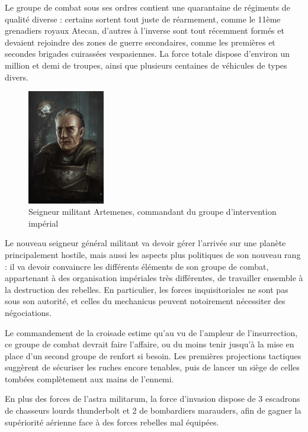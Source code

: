 \documentclass[10pt,a4paper]{book}
\begin{document}
Le groupe de combat sous ses ordres contient une quarantaine de régiments de qualité diverse : certains sortent tout juste de réarmement, comme le 11ème grenadiers royaux Atecan, d'autres à l'inverse sont tout récemment formés et devaient rejoindre des zones de guerre secondaires, comme les premières et secondes brigades cuirassées vespasiennes. La force totale dispose d'environ un million et demi de troupes, ainsi que plusieurs centaines de véhicules de types divers.

\begin{figure}
  \centering
  \includegraphics[width = 0.3\textwidth]{officer 1.jpg}
  \caption{Seigneur militant Artemenes, commandant du groupe d'intervention impérial}
\end{figure}

Le nouveau seigneur général militant va devoir gérer l'arrivée sur une planète principalement hostile, mais aussi les aspects plus politiques de son nouveau rang : il va devoir convaincre les différents éléments de son groupe de combat, appartenant à des organisation impériales très différentes, de travailler ensemble à la destruction des rebelles. En particulier, les forces inquisitoriales ne sont pas sous son autorité, et celles du mechanicus peuvent notoirement nécessiter des négociations.

Le commandement de la croisade estime qu'au vu de l'ampleur de l'insurrection, ce groupe de combat devrait faire l'affaire, ou du moins tenir jusqu'à la mise en place d'un second groupe de renfort si besoin. Les premières projections tactiques suggèrent de sécuriser les ruches encore tenables, puis de lancer un siège de celles tombées complètement aux mains de l'ennemi.

En plus des forces de l'astra militarum, la force d'invasion dispose de 3 escadrons de chasseurs lourds thunderbolt et 2 de bombardiers marauders, afin de gagner la supériorité aérienne face à des forces rebelles mal équipées.
\end{document}
